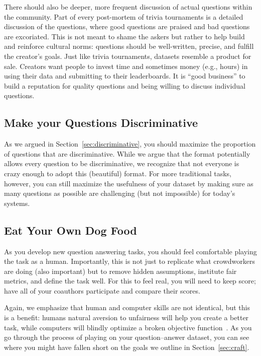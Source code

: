 There should also be deeper, more frequent discussion of actual questions within the  community.
Part of every post-mortem of trivia tournaments is a detailed discussion of the questions, where good questions are praised and bad questions are excoriated.
This is not meant to shame the askers but rather to help build and reinforce cultural norms: questions should be well-written, precise, and fulfill the creator's goals.
Just like trivia tournaments,  datasets resemble a product for sale.
Creators want people to invest time and sometimes money (e.g.,  hours) in using their data and submitting to their leaderboards.
It is ``good business'' to build a reputation for quality questions and being willing to discuss individual questions.

\subsection{Make your Questions Discriminative}

As we argued in Section~\ref{sec:discriminative}, you should maximize the proportion of questions that are discriminative.
While we argue that the \qb{} format potentially allows every question to be discriminative, we recognize that not everyone is crazy enough to adopt this (beautiful) format.
For more traditional  tasks, however, you can still maximize the usefulness of your dataset by making sure as many questions as possible are challenging (but not impossible) for today's  systems.

\subsection{Eat Your Own Dog Food}

As you develop new question answering tasks, you should feel comfortable playing the task as a human.
Importantly, this is not just to replicate what crowdworkers are doing (also important) but to remove hidden assumptions, institute fair metrics, and define the task well.
For this to feel real, you will need to keep score; have all of your coauthors participate and compare their scores.

Again, we emphasize that human and computer skills are not identical, but this is a benefit: humans natural aversion to unfairness will help you create a better task, while computers will blindly optimize a broken objective function~\cite{bostrom-03}.
As you go through the process of playing on your question--answer dataset, you can see where you might have fallen short on the goals we outline in Section~\ref{sec:craft}.

